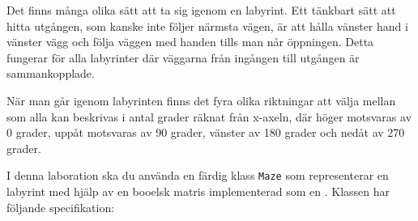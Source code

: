 Det finns många olika sätt att ta sig igenom en labyrint. Ett tänkbart sätt att hitta utgången, som kanske inte följer närmsta vägen, är att hålla vänster hand i vänster vägg och följa väggen med handen tills man når öppningen. Detta fungerar för alla labyrinter där väggarna från ingången till utgången är sammankopplade.

När man går igenom labyrinten finns det fyra olika riktningar att välja mellan som alla kan beskrivas i antal grader räknat från x-axeln, där höger motsvaras av 0 grader, uppåt motsvaras av 90 grader, vänster av 180 grader och nedåt av 270 grader.

I denna laboration ska du använda en färdig klass \texttt{Maze} som representerar en labyrint med hjälp av en booelsk matris implementerad som en \code{Vector[Vector[Boolean]}. 
Klassen har följande specifikation:

